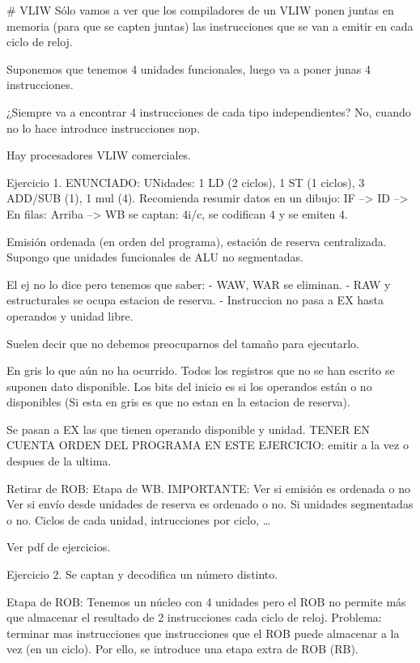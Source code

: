 # VLIW
Sólo vamos a ver que los compiladores de un VLIW ponen juntas en memoria (para que se capten juntas) las instrucciones que se van a emitir en cada ciclo de reloj.

Suponemos que tenemos 4 unidades funcionales, luego va a poner junas 4 instrucciones.

¿Siempre va a encontrar 4 instrucciones de cada tipo independientes?
No, cuando no lo hace introduce instrucciones nop.

Hay procesadores VLIW comerciales.









Ejercicio 1. ENUNCIADO:
UNidades: 1 LD (2 ciclos), 1 ST (1 ciclos), 3 ADD/SUB (1), 1 mul (4).
Recomienda resumir datos en un dibujo:
IF --> ID --> En filas: Arriba --> WB
se captan: 4i/c, se codifican 4 y se emiten 4.

Emisión ordenada (en orden del programa), estación de reserva centralizada.
Supongo que unidades funcionales de ALU no segmentadas.

El ej no lo dice pero tenemos que saber:
- WAW, WAR se eliminan.
- RAW y estructurales se ocupa estacion de reserva.
- Instruccion no pasa a EX hasta operandos y unidad libre.

Suelen decir que no debemos preocuparnos del tamaño para ejecutarlo.

En gris lo que aún no ha ocurrido.
Todos los registros que no se han escrito se suponen dato disponible.
Los bits del inicio es si los operandos están o no disponibles (Si esta en gris es que no estan en la estacion de reserva).



Se pasan a EX las que tienen operando disponible y unidad.
TENER EN CUENTA ORDEN DEL PROGRAMA EN ESTE EJERCICIO: emitir a la vez o despues de la ultima.


Retirar de ROB: Etapa de WB.
IMPORTANTE: 
    Ver si emisión es ordenada o no
    Ver si envío desde unidades de reserva es ordenado o no.
    Si unidades segmentadas o no.
    Ciclos de cada unidad, intrucciones por ciclo, \ldots


Ver pdf de ejercicios.

Ejercicio 2.
Se captan y decodifica un número distinto.

Etapa de ROB:
    Tenemos un núcleo con 4 unidades pero el ROB no permite más que almacenar el resultado de 2 instrucciones cada ciclo de reloj.
    Problema: terminar mas instrucciones que instrucciones que el ROB puede almacenar a la vez (en un ciclo).
    Por ello, se introduce una etapa extra de ROB (RB). 
